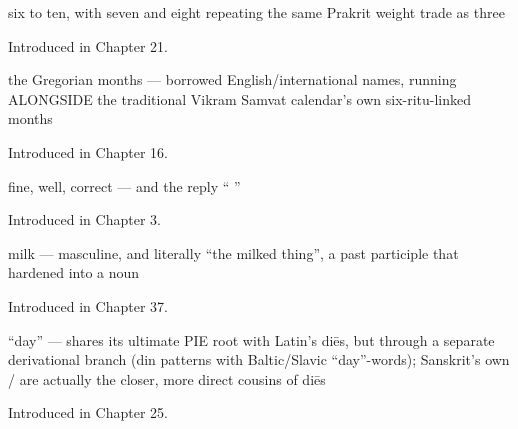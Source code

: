 \noindent\begin{minipage}[t]{\linewidth}
\raggedright
\textbf{    }\par
\small six to ten, with seven and eight repeating the same Prakrit weight trade as three\par
\footnotesize Introduced in Chapter 21.
\end{minipage}\par\medskip

\noindent\begin{minipage}[t]{\linewidth}
\raggedright
\textbf{           }\par
\small the Gregorian months — borrowed English/international names, running ALONGSIDE the traditional Vikram Samvat calendar's own six-ritu-linked months\par
\footnotesize Introduced in Chapter 16.
\end{minipage}\par\medskip

\noindent\begin{minipage}[t]{\linewidth}
\raggedright
\textbf{}\par
\small fine, well, correct — and the reply \textquotedblleft{}  \textquotedblright{}\par
\footnotesize Introduced in Chapter 3.
\end{minipage}\par\medskip

\noindent\begin{minipage}[t]{\linewidth}
\raggedright
\textbf{}\par
\small milk — masculine, and literally \textquotedblleft{}the milked thing\textquotedblright{}, a past participle that hardened into a noun\par
\footnotesize Introduced in Chapter 37.
\end{minipage}\par\medskip

\noindent\begin{minipage}[t]{\linewidth}
\raggedright
\textbf{}\par
\small \textquotedblleft{}day\textquotedblright{} — shares its ultimate PIE root with Latin's diēs, but through a separate derivational branch (din patterns with Baltic/Slavic \textquotedblleft{}day\textquotedblright{}-words); Sanskrit's own / are actually the closer, more direct cousins of diēs\par
\footnotesize Introduced in Chapter 25.
\end{minipage}\par\medskip

